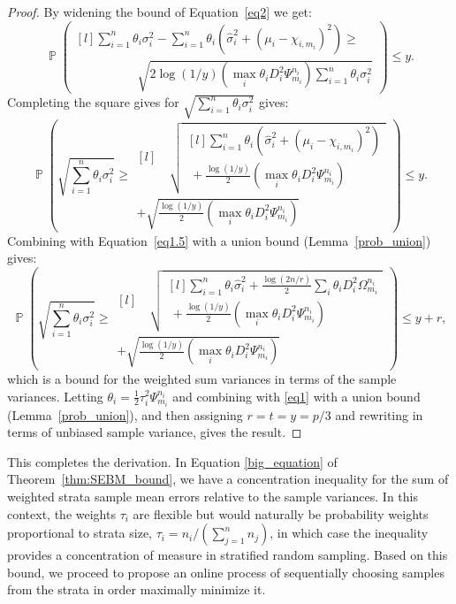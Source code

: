 \documentclass[]{interact}
\DeclareMathOperator{\pr}{\mathbb{P}}
\theoremstyle{plain}%
\theoremstyle{definition}
\theoremstyle{remark}
\begin{document}
\begin{proof}
By widening the bound of Equation~\eqref{eq2} we get:
$$
\pr\left(\begin{matrix*}[l]\sum_{i=1}^n\theta_i\sigma_i^2-\sum_{i=1}^n\theta_i(\hat{\sigma}_i^2+(\mu_i - \chi_{i,m_i})^2)\ge \\ \quad\quad\quad\quad\quad \sqrt{2\log(1/y)(\max_i\theta_iD_i^2\Psi_{m_i}^{n_i})\sum_{i=1}^n\theta_i\sigma_i^2}\end{matrix*}\right) \le y.
$$
Completing the square gives for $\sqrt{\sum_{i=1}^n\theta_i\sigma_i^2}$ gives:
$$
\pr\left(\sqrt{\sum_{i=1}^n\theta_i\sigma_i^2} \ge \begin{matrix*}[l]\quad\sqrt{\begin{matrix*}[l]\sum_{i=1}^n\theta_i(\hat{\sigma}_i^2+(\mu_i - \chi_{i,m_i})^2)\\ ~ + \frac{\log(1/y)}{2}\left(\max_i\theta_iD_i^2\Psi_{m_i}^{n_i}\right)\end{matrix*}} \\  +\sqrt{\frac{\log(1/y)}{2}\left(\max_i\theta_iD_i^2\Psi_{m_i}^{n_i}\right)}\end{matrix*}\right) \le y. 
$$
Combining with Equation~\eqref{eq1.5} with a union bound (Lemma~\ref{prob_union}) gives:
$$
\pr\left(\sqrt{\sum_{i=1}^n\theta_i\sigma_i^2} \ge \begin{matrix*}[l]\quad\sqrt{\begin{matrix*}[l]\sum_{i=1}^n\theta_i\hat{\sigma}_i^2+ \frac{\log(2n/r)}{2}\sum_i\theta_iD_i^2\Omega_{m_i}^{n_i} \\ ~+ \frac{\log(1/y)}{2}\left(\max_i\theta_iD_i^2\Psi_{m_i}^{n_i}\right)\end{matrix*}} \\ +\sqrt{\frac{\log(1/y)}{2}\left(\max_i\theta_iD_i^2\Psi_{m_i}^{n_i}\right)}\end{matrix*}\right) \le y+r ,
$$
which is a bound for the weighted sum variances in terms of the sample variances.
Letting $\theta_i = \frac{1}{2}\tau_i^2\Psi_{m_i}^{n_i}$ and combining with \eqref{eq1} with a union bound (Lemma~\ref{prob_union}), 
and then assigning $ r=t=y=p/3 $ and rewriting in terms of unbiased sample variance, gives the result.
\end{proof}

This completes the derivation.
In Equation \eqref{big_equation} of Theorem~\ref{thm:SEBM_bound}, we have a concentration inequality for the sum of weighted strata sample mean errors relative to the sample variances. 
In this context, the weights $\tau_i$ are flexible but would naturally be probability weights proportional to strata size,  $\tau_i=n_i/(\sum_{j=1}^nn_j)$, 
in which case the inequality provides a concentration of measure in stratified random sampling.
Based on this bound, we proceed to propose an online process of sequentially choosing samples from the strata in order maximally minimize it.
\end{document}
